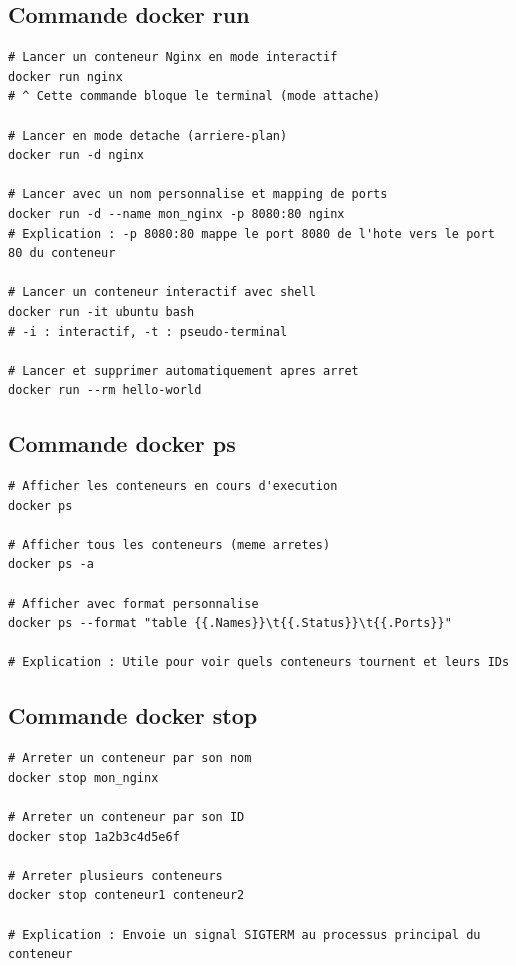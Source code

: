 \documentclass[a4paper,12pt]{article}
\begin{document}
\subsection{Commande docker run}
\begin{lstlisting}[caption=Lancer des conteneurs]
# Lancer un conteneur Nginx en mode interactif
docker run nginx
# ^ Cette commande bloque le terminal (mode attache)

# Lancer en mode detache (arriere-plan)
docker run -d nginx

# Lancer avec un nom personnalise et mapping de ports
docker run -d --name mon_nginx -p 8080:80 nginx
# Explication : -p 8080:80 mappe le port 8080 de l'hote vers le port 80 du conteneur

# Lancer un conteneur interactif avec shell
docker run -it ubuntu bash
# -i : interactif, -t : pseudo-terminal

# Lancer et supprimer automatiquement apres arret
docker run --rm hello-world
\end{lstlisting}

\subsection{Commande docker ps}
\begin{lstlisting}[caption=Lister les conteneurs]
# Afficher les conteneurs en cours d'execution
docker ps

# Afficher tous les conteneurs (meme arretes)
docker ps -a

# Afficher avec format personnalise
docker ps --format "table {{.Names}}\t{{.Status}}\t{{.Ports}}"

# Explication : Utile pour voir quels conteneurs tournent et leurs IDs
\end{lstlisting}

\subsection{Commande docker stop}
\begin{lstlisting}[caption=Arreter des conteneurs]
# Arreter un conteneur par son nom
docker stop mon_nginx

# Arreter un conteneur par son ID
docker stop 1a2b3c4d5e6f

# Arreter plusieurs conteneurs
docker stop conteneur1 conteneur2

# Explication : Envoie un signal SIGTERM au processus principal du conteneur
\end{lstlisting}
\end{document}
